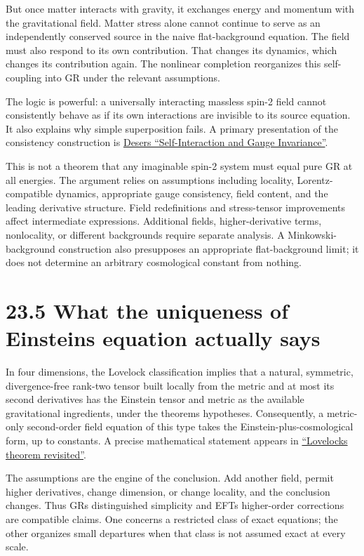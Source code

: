 \documentclass[
  11pt,
  letterpaper,
  oneside,
  openany]{scrbook}
\begin{document}
But once matter interacts with gravity, it exchanges energy and momentum
with the gravitational field. Matter stress alone cannot continue to
serve as an independently conserved source in the naive flat-background
equation. The field must also respond to its own contribution. That
changes its dynamics, which changes its contribution again. The
nonlinear completion reorganizes this self-coupling into GR under the
relevant assumptions.

The logic is powerful: a universally interacting massless spin-2 field
cannot consistently behave as if its own interactions are invisible to
its source equation. It also explains why simple superposition fails. A
primary presentation of the consistency construction is
\href{https://arxiv.org/abs/gr-qc/0411023}{Deser\textquotesingle s
``Self-Interaction and Gauge Invariance''}.

This is not a theorem that any imaginable spin-2 system must equal pure
GR at all energies. The argument relies on assumptions including
locality, Lorentz-compatible dynamics, appropriate gauge consistency,
field content, and the leading derivative structure. Field redefinitions
and stress-tensor improvements affect intermediate expressions.
Additional fields, higher-derivative terms, nonlocality, or different
backgrounds require separate analysis. A Minkowski-background
construction also presupposes an appropriate flat-background limit; it
does not determine an arbitrary cosmological constant from nothing.

\hypertarget{what-the-uniqueness-of-einsteins-equation-actually-says}{%
\section{23.5 What the uniqueness of Einstein\textquotesingle s equation
actually
says}\label{what-the-uniqueness-of-einsteins-equation-actually-says}}

In four dimensions, the Lovelock classification implies that a natural,
symmetric, divergence-free rank-two tensor built locally from the metric
and at most its second derivatives has the Einstein tensor and metric as
the available gravitational ingredients, under the
theorem\textquotesingle s hypotheses. Consequently, a metric-only
second-order field equation of this type takes the
Einstein-plus-cosmological form, up to constants. A precise mathematical
statement appears in
\href{https://arxiv.org/html/1005.2386v4}{``Lovelock\textquotesingle s
theorem revisited''}.

The assumptions are the engine of the conclusion. Add another field,
permit higher derivatives, change dimension, or change locality, and the
conclusion changes. Thus GR\textquotesingle s distinguished simplicity
and EFT\textquotesingle s higher-order corrections are compatible
claims. One concerns a restricted class of exact equations; the other
organizes small departures when that class is not assumed exact at every
scale.
\end{document}

